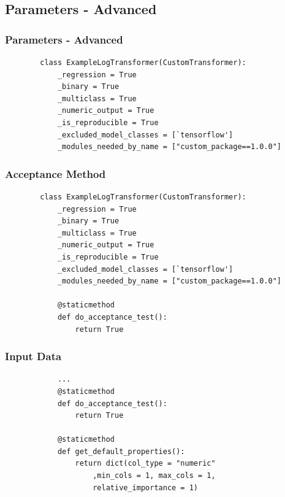 \documentclass[11pt,
aspectratio=169,
hyperref={colorlinks}
]{beamer}
\begin{document}
\subsection{Parameters - Advanced}
\begin{frame}[fragile]
        \frametitle{Parameters - Advanced}
        \begin{verbatim}
        class ExampleLogTransformer(CustomTransformer):
            _regression = True
            _binary = True
            _multiclass = True
            _numeric_output = True
            _is_reproducible = True
            _excluded_model_classes = [`tensorflow']
            _modules_needed_by_name = ["custom_package==1.0.0"]
        \end{verbatim}
\end{frame}
\begin{frame}[fragile]
        \frametitle{Acceptance Method}
        \begin{verbatim}
        class ExampleLogTransformer(CustomTransformer):
            _regression = True
            _binary = True
            _multiclass = True
            _numeric_output = True
            _is_reproducible = True
            _excluded_model_classes = [`tensorflow']
            _modules_needed_by_name = ["custom_package==1.0.0"]

            @staticmethod
            def do_acceptance_test():
                return True
        \end{verbatim}
\end{frame}
\begin{frame}[fragile]
        \frametitle{Input Data}
        \begin{verbatim}
            ...
            @staticmethod
            def do_acceptance_test():
                return True

            @staticmethod
            def get_default_properties():
                return dict(col_type = "numeric"
                    ,min_cols = 1, max_cols = 1, 
                    relative_importance = 1)
        \end{verbatim}
\end{frame}
\end{document}

